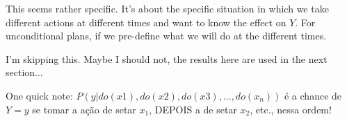 This seems rather specific. It's about the specific situation in which we take different actions at different times and want to know the effect on $Y$. For unconditional plans, if we pre-define what we will do at the different times.

I'm skipping this. Maybe I should not, the results here are used in the next section...

One quick note: $P(y|do(x1),do(x2),do(x3),...,do(x_n))$ é a chance de $Y=y$ se tomar a ação de setar $x_1$, DEPOIS a de setar $x_2$, etc., nessa ordem!
